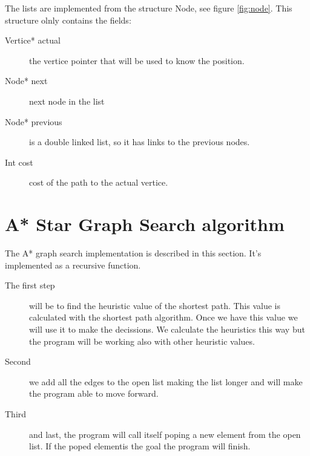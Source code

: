 The lists are implemented from the structure Node, see figure \ref{fig:node}. This structure olnly contains the fields:
\begin{description}
\item[Vertice* actual] the vertice pointer that will be used to know the position.
\item[Node* next] next node in the list
\item[Node* previous] is a double linked list, so it has links to the previous nodes.
\item[Int cost] cost of the path to the actual vertice.
\end{description}

\section{A* Star Graph Search algorithm}
The A* graph search implementation is described in this section. It's implemented as a recursive function.\\ 
\begin{description}
\item[The first step] will be to find the heuristic value of the shortest path. This value is calculated with the shortest path algorithm. 
Once we have this value we will use it to make the decissions. We calculate the heuristics this way but the program will be working also 
with other heuristic values.
\item[Second] we add all the edges to the open list making the list longer and will make the program able to move forward.
\item[Third] and last, the program will call itself poping a new element from the open list. If the poped elementis the goal the program 
will finish. 
\end{description}

